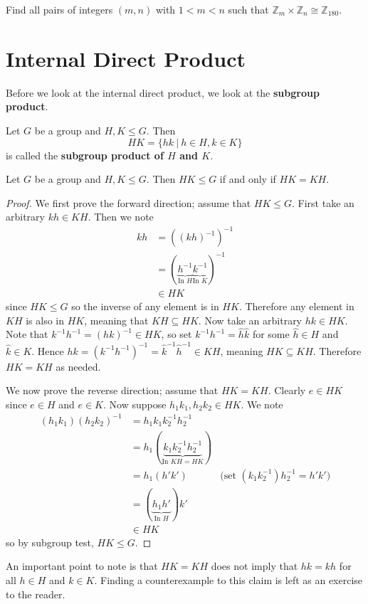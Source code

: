 \begin{exercise}
    Find all pairs of integers $(m, n)$ with $1 < m < n$ such that $\mathbb{Z}_m \times \mathbb{Z}_n \cong \mathbb{Z}_{180}$.
\end{exercise}

\section{Internal Direct Product}
Before we look at the internal direct product, we look at the \textbf{subgroup product}.
\begin{definition}
    Let $G$ be a group and $H, K \leq G$. Then
    \[
        HK = \{hk \ | \ h \in H, k \in K\}
    \]
    is called the \textbf{subgroup product of $H$ and $K$}.
\end{definition}
\begin{proposition}\label{prop-subgroup-product-is-subgroup}
    Let $G$ be a group and $H, K \leq G$. Then $HK \leq G$ if and only if $HK = KH$.
\end{proposition}
\begin{proof}
    We first prove the forward direction; assume that $HK \leq G$. First take an arbitrary $kh \in KH$. Then we note
    \begin{align*}
        kh &= \left(\left(kh\right)^{-1}\right)^{-1}\\
        &= (\underbrace{h^{-1}}_{\text{In } H}\underbrace{k^{-1}}_{\text{In } K})^{-1}\\
        &\in HK
    \end{align*}
    since $HK \leq G$ so the inverse of any element is in $HK$. Therefore any element in $KH$ is also in $HK$, meaning that $KH \subseteq HK$. Now take an arbitrary $hk \in HK$. Note that $k^{-1}h^{-1} = (hk)^{-1} \in HK$, so set $k^{-1}h^{-1} = \hat{h}\hat{k}$ for some $\hat{h} \in H$ and $\hat{k} \in K$. Hence $hk = \left(k^{-1}h^{-1}\right)^{-1} = \hat{k}^{-1}\hat{h}^{-1} \in KH$, meaning $HK \subseteq KH$. Therefore $HK = KH$ as needed.

    We now prove the reverse direction; assume that $HK = KH$. Clearly $e \in HK$ since $e \in H$ and $e \in K$. Now suppose $h_1k_1, h_2k_2 \in HK$. We note
    \begin{align*}
        (h_1k_1)(h_2k_2)^{-1} &= h_1k_1k_2^{-1}h_2^{-1}\\
        &= h_1(\underbrace{k_1k_2^{-1}h_2^{-1}}_{\text{In } KH = HK})\\
        &= h_1(h'k') & \text{(set }(k_1k_2^{-1})h_2^{-1} = h'k')\\
        &= (\underbrace{h_1h'}_{\text{In } H})k'\\
        &\in HK
    \end{align*}
    so by subgroup test, $HK \leq G$.
\end{proof}
An important point to note is that $HK = KH$ does not imply that $hk = kh$ for all $h \in H$ and $k \in K$. Finding a counterexample to this claim is left as an exercise to the reader.


